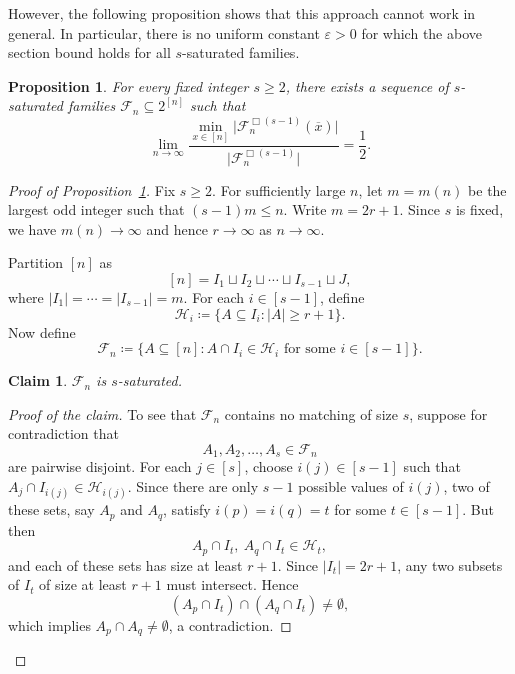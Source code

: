 \documentclass[11pt]{article}
\newtheorem{prop}[theorem]{Proposition}
\newtheorem{claim}[theorem]{Claim}
\theoremstyle{definition}
\newenvironment{poc}{\begin{proof}[Proof of the claim]\renewcommand*{\qedsymbol}{$\blacksquare$}}{\end{proof}}
\begin{document}
However, the following proposition shows that this approach cannot work in general. In particular, there is no uniform constant \(\varepsilon>0\) for which the above section bound holds for all \(s\)-saturated families.

\begin{prop}\label{prop:section-ratio-sharp}
For every fixed integer \(s\ge 2\), there exists a sequence of \(s\)-saturated families
\(
\mathcal{F}_{n}\subseteq 2^{[n]}
\)
such that
\[
\lim_{n\to\infty}
\frac{\min_{x\in [n]} \bigl|\mathcal{F}_{n}^{\Box(s-1)}(\overline{x})\bigr|}
     {\bigl|\mathcal{F}_{n}^{\Box(s-1)}\bigr|}
=
\frac{1}{2}.
\]
\end{prop}
\begin{proof}[Proof of Proposition~\ref{prop:section-ratio-sharp}]
    Fix \(s\ge 2\). For sufficiently large \(n\), let \(m=m(n)\) be the largest odd integer such that
\(
(s-1)m\le n.
\)
Write
\(
m=2r+1.
\)
Since \(s\) is fixed, we have \(m(n)\to\infty\) and hence \(r\to\infty\) as \(n\to\infty\).

Partition \([n]\) as
\[
[n]=I_{1}\sqcup I_{2}\sqcup \cdots \sqcup I_{s-1}\sqcup J,
\]
where
\(
|I_{1}|=\cdots=|I_{s-1}|=m.
\) For each \(i\in [s-1]\), define
\[
\mathcal{H}_{i}
\coloneqq
\{A\subseteq I_{i}: |A|\ge r+1\}.
\]
Now define
\[
\mathcal{F}_{n}
\coloneqq
\bigl\{
A\subseteq [n]:
A\cap I_{i}\in \mathcal{H}_{i}\text{ for some }i\in [s-1]
\bigr\}.
\]
\begin{claim}\label{claim:FnSaturated}
    \(\mathcal{F}_{n}\) is \(s\)-saturated.
\end{claim}
\begin{poc}
  To see that \(\mathcal{F}_{n}\) contains no matching of size \(s\), suppose for contradiction that
\[
A_{1},A_{2},\dots,A_{s}\in \mathcal{F}_{n}
\]
are pairwise disjoint. For each \(j\in [s]\), choose \(i(j)\in [s-1]\) such that
\(
A_{j}\cap I_{i(j)}\in \mathcal{H}_{i(j)}.
\) Since there are only \(s-1\) possible values of \(i(j)\), two of these sets, say \(A_{p}\) and \(A_{q}\), satisfy
\(
i(p)=i(q)=t
\)
for some \(t\in [s-1]\). But then
\[
A_{p}\cap I_{t},\ A_{q}\cap I_{t}\in \mathcal{H}_{t},
\]
and each of these sets has size at least \(r+1\). Since \(|I_{t}|=2r+1\), any two subsets of \(I_t\) of size at least \(r+1\) must intersect. Hence
\[
(A_{p}\cap I_{t})\cap (A_{q}\cap I_{t})\neq\emptyset,
\]
which implies \(A_{p}\cap A_{q}\neq\emptyset\), a contradiction. 


\end{poc}
\end{proof}
\end{document}
